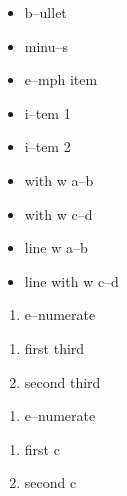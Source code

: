 \documentclass{book}
\begin{document}
\begin{itemize}[label=\textbullet{}]
\item b--ullet
\end{itemize}

\begin{itemize}[label=-]
\item minu--s
\end{itemize}

\begin{itemize}[label=\emph{after emph}]
\item e--mph item
\end{itemize}

\begin{itemize}[label=\textbullet{} a--n itemize line]
\item {}%
i--tem 1
\item i--tem 2
\end{itemize}

\begin{itemize}[label={}]
\item with w a--b
\item with w c--d
\end{itemize}

\begin{itemize}[label=\hbox{} on a line]
\item line w a--b
\item line with w c--d
\end{itemize}

\begin{enumerate}[start=1]
\item e--numerate
\end{enumerate}

\begin{enumerate}[start=3]
\item first third
\item second third
\end{enumerate}

\begin{enumerate}[label=\alph*.]
\item e--numerate
\end{enumerate}

\begin{enumerate}[label=\alph*.,start=3]
\item first c
\item second c
\end{enumerate}
\end{document}
